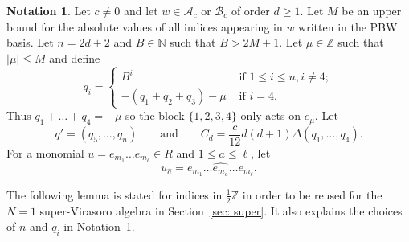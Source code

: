 \documentclass[12pt]{amsart}
\theoremstyle{plain}
\theoremstyle{definition}
\newtheorem{notation}[theorem]{Notation}
\numberwithin{equation}{theorem}
\newcommand{\NN}{\mathbb{N}}
\newcommand{\ZZ}{\mathbb{Z}}
\newcommand{\calA}{\mathcal A}
\newcommand{\calB}{\mathcal B}
\newcommand{\length}[1]{\left\lvert #1\right\rvert}
\begin{document}
\begin{notation}\label{not: degree reduction}
    Let $c \neq 0$ and let $w \in \calA_c$ or $\calB_c$ of order $d \geq 1$. Let $M$ be an upper bound for the absolute values of all indices appearing in $w$ written in the PBW basis. Let $n = 2d+2$ and $B \in \NN$ such that $B > 2M+1$. Let $\mu \in \ZZ$ such that $\length{\mu} \leq M$ and define 
    \begin{equation}
        q_i =  \begin{cases}
            B^i & \text{ if } 1 \leq i \leq n, i \neq 4; \\ 
            -(q_1+q_2+q_3)-\mu & \text{ if } i = 4.
        \end{cases}
    \end{equation}
    Thus $q_1+\dots + q_4 = -\mu$ so the block $\{1, 2, 3, 4\}$ only acts on $e_\mu$. Let 
    \begin{equation}\label{eqdef: C}
        q' = (q_5, \dots, q_n) \qquad \text{and} \qquad C_d = \frac{c}{12} d(d+1) \Delta (q_1, \dots, q_4).
    \end{equation}
    For a monomial $u = e_{m_1} \dots e_{m_\ell} \in R$ and $1 \leq a \leq \ell$, let 
    \[u_{\hat{a}} = e_{m_1} \dots \widehat{e_{m_a}} \dots e_{m_\ell}.\]
\end{notation}

The following lemma is stated for indices in $\frac{1}{2}\ZZ$ in order to be reused for the $N=1$ super-Virasoro algebra in Section~\ref{sec: super}. It also explains the choices of $n$ and $q_i$ in Notation~\ref{not: degree reduction}.
\end{document}
